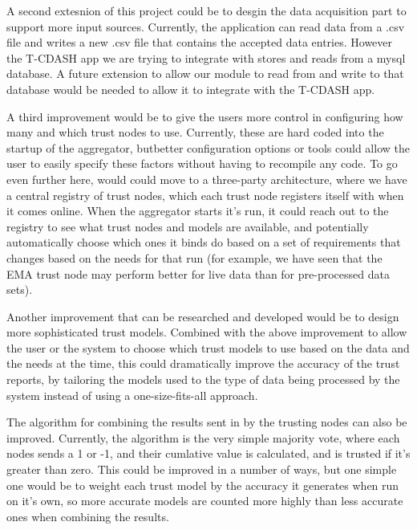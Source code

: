 \documentclass[11pt]{article}
\begin{document}
A second extesnion of this project could be to desgin the data acquisition part to support more input sources. Currently, the application can read data from a .csv file and writes a new .csv file that contains the accepted data entries. However the T-CDASH app we are trying to integrate with stores and reads from a mysql database. A future extension to allow our module to read from and write to that database would be needed to allow it to integrate with the T-CDASH app.

A third improvement would be to give the users more control in configuring how many and which trust nodes to use. Currently, these are hard coded into the startup of the aggregator, butbetter configuration options or tools could allow the user to easily specify these factors without having to recompile any code. To go even further here, would could move to a three-party architecture, where we have a central registry of trust nodes, which each trust node registers itself with when it comes online. When the aggregator starts it's run, it could reach out to the registry to see what trust nodes and models are available, and potentially automatically choose which ones it binds do based on a set of requirements that changes based on the needs for that run (for example, we have seen that the EMA trust node may perform better for live data than for pre-processed data sets).

Another improvement that can be researched and developed would be to design more sophisticated trust models. Combined with the above improvement to allow the user or the system to choose which trust models to use based on the data and the needs at the time, this could dramatically improve the accuracy of the trust reports, by tailoring the models used to the type of data being processed by the system instead of using a one-size-fits-all approach.

The algorithm for combining the results sent in by the trusting nodes can also be improved. Currently, the algorithm is the very simple majority vote, where each nodes sends a 1 or -1, and their cumlative value is calculated, and is trusted if it's greater than zero. This could be improved in a number of ways, but one simple one would be to weight each trust model by the accuracy it generates when run on it's own, so more accurate models are counted more highly than less accurate ones when combining the results.
\end{document}
